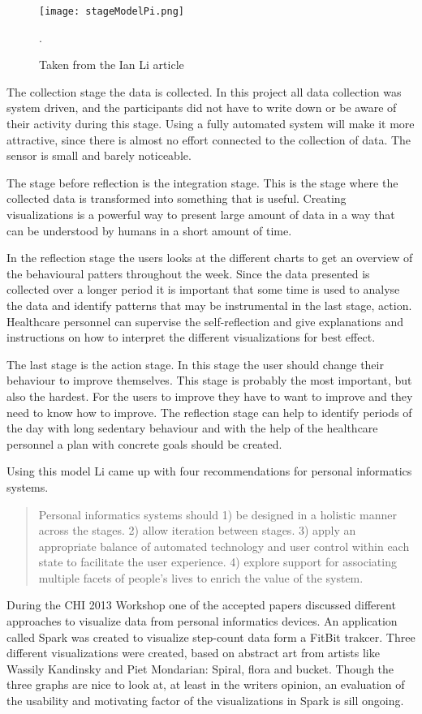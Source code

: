 \begin{figure}[h!]
	\centering
		\texttt{[image: stageModelPi.png]}
		\caption{\footnotesize Taken from the Ian Li article \cite{li2010}}.
		\label{fig:stageModelPi}
\end{figure}

The collection stage the data is collected. In this project all data collection was system driven, and the participants did not have to write down or be aware of their activity during this stage. Using a fully automated system will make it more attractive, since there is almost no effort connected to the collection of data. The sensor is small and barely noticeable.

The stage before reflection is the integration stage. This is the stage where the collected data is transformed into something that is useful. Creating visualizations is a powerful way to present large amount of data in a way that can be understood by humans in a short amount of time. 

In the reflection stage the users looks at the different charts to get an overview of the behavioural patters throughout the week. Since the data presented is collected over a longer period it is important that some time is used to analyse the data and identify patterns that may be instrumental in the last stage, action. Healthcare personnel can supervise the self-reflection and give explanations and instructions on how to interpret the different visualizations for best effect.

The last stage is the action stage. In this stage the user should change their behaviour to improve themselves. This stage is probably the most important, but also the hardest. For the users to improve they have to want to improve and they need to know how to improve. The reflection stage can help to identify periods of the day with long sedentary behaviour and with the help of the healthcare personnel a plan with concrete goals should be created. 

Using this model Li %
came up with four recommendations for personal informatics systems. 
\begin{quote}
	Personal informatics systems should
	1) be designed in a holistic manner across the stages.
	2) allow iteration between stages.
	3) apply an appropriate balance of automated technology and user control within each state to facilitate the user experience.
	4) explore support for associating multiple facets of people's lives to enrich the value of the system.
\end{quote}


During the CHI 2013 Workshop \cite{chi2013} one of the accepted papers discussed different approaches to visualize data from personal informatics devices. %
An application called Spark was created to visualize step-count data form a FitBit trakcer. %
Three different visualizations were created, based on abstract art from artists like Wassily Kandinsky and Piet Mondarian: Spiral, flora and bucket. %
Though the three graphs are nice to look at, at least in the writers opinion, an evaluation of the usability and motivating factor of the visualizations in Spark is sill ongoing. 
